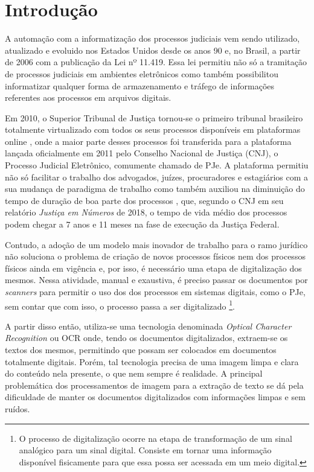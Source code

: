\chapter[Introdução]{Introdução}

A automação com a informatização dos processos judiciais vem sendo utilizado, atualizado e evoluido nos Estados Unidos desde os anos 90 \cite{automating-judicial-doc} e, no Brasil, a partir de 2006 com a publicação da Lei nº 11.419. Essa lei permitiu não só a tramitação de processos judiciais em ambientes eletrônicos \cite{digitalizacao-de-proc-judiciais} como também possibilitou informatizar qualquer forma de armazenamento e tráfego de informações referentes aos processos em arquivos digitais.

Em 2010, o Superior Tribunal de Justiça tornou-se o primeiro tribunal brasileiro totalmente virtualizado com todos os seus processos disponíveis em plataformas online \cite{digitalizacao-de-proc-judiciais}, onde a maior parte desses processos foi transferida para a plataforma lançada oficialmente em 2011 pelo Conselho Nacional de Justiça (CNJ), o Processo Judicial Eletrônico, comumente chamado de PJe. A plataforma permitiu não só facilitar o trabalho dos advogados, juízes, procuradores e estagiários com a sua mudança de paradigma de trabalho como também auxiliou na diminuição do tempo de duração de boa parte dos processos \cite{pje-diminuicao-tempo-do=proc}, que, segundo o CNJ em seu relatório \textit{Justiça em Números} de 2018, o tempo de vida médio dos processos podem chegar a 7 anos e 11 meses na fase de execução da Justiça Federal.

Contudo, a adoção de um modelo mais inovador de trabalho para o ramo jurídico não soluciona o problema de criação de novos processos físicos nem dos processos físicos ainda em vigência e, por isso, é necessário uma etapa de digitalização dos mesmos. Nessa atividade, manual e exaustiva, é preciso passar os documentos por \textit{scanners} para permitir o uso dos dos processos em sistemas digitais, como o PJe, sem contar que com isso, o processo passa a ser digitalizado
    \footnote{
        O processo de digitalização ocorre na etapa de transformação de um sinal analógico para um sinal digital. Consiste em tornar uma informação disponível fisicamente para que essa possa ser acessada em um meio digital.
    }.

A partir disso então, utiliza-se uma tecnologia denominada \textit{Optical Character Recognition} ou OCR onde, tendo os documentos digitalizados, extraem-se os textos dos mesmos, permitindo que possam ser colocados em documentos totalmente digitais. Porém, tal tecnologia precisa de uma imagem limpa e clara do conteúdo nela presente, o que nem sempre é realidade. A principal problemática dos processamentos de imagem para a extração de texto se dá pela dificuldade de manter os documentos digitalizados com informações limpas e sem ruídos.

